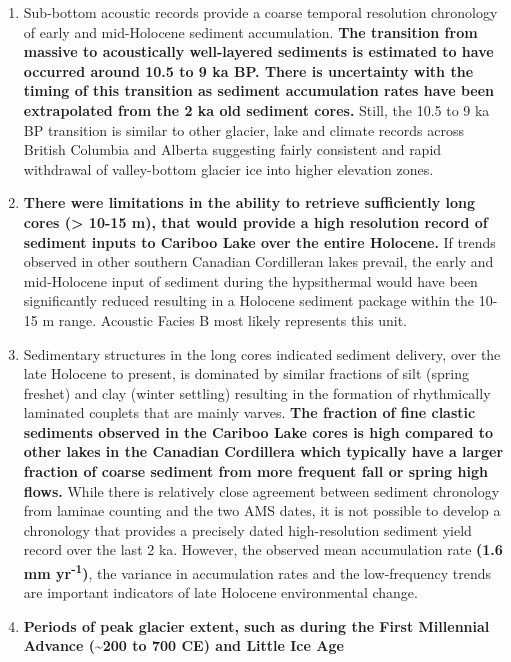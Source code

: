 \documentclass[Royal,times,doublespace,sageh]{sagej}
\providecommand{\tightlist}{%
  \setlength{\itemsep}{0pt}\setlength{\parskip}{0pt}}
\begin{document}
\begin{enumerate}
\def\labelenumi{\arabic{enumi}.}
\tightlist
\item
  Sub-bottom acoustic records provide a coarse temporal resolution
  chronology of early and mid-Holocene sediment accumulation.
  \textbf{The transition from massive to acoustically well-layered
  sediments is estimated to have occurred around 10.5 to 9 ka BP. There
  is uncertainty with the timing of this transition as sediment
  accumulation rates have been extrapolated from the 2 ka old sediment
  cores.} Still, the 10.5 to 9 ka BP transition is similar to other
  glacier, lake and climate records across British Columbia and Alberta
  suggesting fairly consistent and rapid withdrawal of valley-bottom
  glacier ice into higher elevation zones.
\item
  \textbf{There were limitations in the ability to retrieve sufficiently
  long cores (\textgreater{} 10-15 m), that would provide a high
  resolution record of sediment inputs to Cariboo Lake over the entire
  Holocene.} If trends observed in other southern Canadian Cordilleran
  lakes prevail, the early and mid-Holocene input of sediment during the
  hypsithermal would have been significantly reduced resulting in a
  Holocene sediment package within the 10-15 m range. Acoustic Facies B
  most likely represents this unit.
\item
  Sedimentary structures in the long cores indicated sediment delivery,
  over the late Holocene to present, is dominated by similar fractions
  of silt (spring freshet) and clay (winter settling) resulting in the
  formation of rhythmically laminated couplets that are mainly varves.
  \textbf{The fraction of fine clastic sediments observed in the Cariboo
  Lake cores is high compared to other lakes in the Canadian Cordillera
  which typically have a larger fraction of coarse sediment from more
  frequent fall or spring high flows.} While there is relatively close
  agreement between sediment chronology from laminae counting and the
  two AMS dates, it is not possible to develop a chronology that
  provides a precisely dated high-resolution sediment yield record over
  the last 2 ka. However, the observed mean accumulation rate
  \textbf{(1.6 mm yr\textsuperscript{-1})}, the variance in accumulation
  rates and the low-frequency trends are important indicators of late
  Holocene environmental change.
\item
  \textbf{Periods of peak glacier extent, such as during the First
  Millennial Advance (\textasciitilde200 to 700 CE) and Little Ice Age
}
\end{enumerate}
\end{document}
